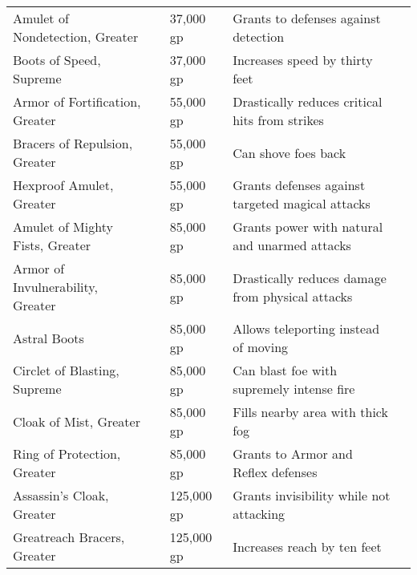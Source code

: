 \begin{longtabuwrapper}
\begin{longtabu}{l l l X l}
Amulet of Nondetection, Greater &  & 37,000 gp & Grants  to defenses against detection & \pageref{item:Amulet of Nondetection, Greater} \\
Boots of Speed, Supreme &  & 37,000 gp & Increases speed by thirty feet & \pageref{item:Boots of Speed, Supreme} \\
Armor of Fortification, Greater &  & 55,000 gp & Drastically reduces critical hits from strikes & \pageref{item:Armor of Fortification, Greater} \\
Bracers of Repulsion, Greater &  & 55,000 gp & Can shove foes back & \pageref{item:Bracers of Repulsion, Greater} \\
Hexproof Amulet, Greater &  & 55,000 gp & Grants  defenses against targeted magical attacks & \pageref{item:Hexproof Amulet, Greater} \\
Amulet of Mighty Fists, Greater &  & 85,000 gp & Grants  power with natural and unarmed attacks & \pageref{item:Amulet of Mighty Fists, Greater} \\
Armor of Invulnerability, Greater &  & 85,000 gp & Drastically reduces damage from physical attacks & \pageref{item:Armor of Invulnerability, Greater} \\
Astral Boots &  & 85,000 gp & Allows teleporting instead of moving & \pageref{item:Astral Boots} \\
Circlet of Blasting, Supreme &  & 85,000 gp & Can blast foe with supremely intense fire & \pageref{item:Circlet of Blasting, Supreme} \\
Cloak of Mist, Greater &  & 85,000 gp & Fills nearby area with thick fog & \pageref{item:Cloak of Mist, Greater} \\
Ring of Protection, Greater &  & 85,000 gp & Grants  to Armor and Reflex defenses & \pageref{item:Ring of Protection, Greater} \\
Assassin's Cloak, Greater &  & 125,000 gp & Grants invisibility while not attacking & \pageref{item:Assassin's Cloak, Greater} \\
Greatreach Bracers, Greater &  & 125,000 gp & Increases reach by ten feet & \pageref{item:Greatreach Bracers, Greater} \\
\end{longtabu}
\end{longtabuwrapper}
